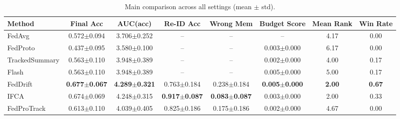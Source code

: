 \begin{table}[t]
\centering
\caption{Main comparison across all settings (mean $\pm$ std).}
\label{tab:main}
\begin{tabular}{lccccccc}
\toprule
Method & Final Acc & AUC(acc) & Re-ID Acc & Wrong Mem & Budget Score & Mean Rank & Win Rate \\
\midrule
FedAvg & 0.572$\pm$0.094 & 3.706$\pm$0.252 & -- & -- & -- & 4.17 & 0.00 \\
FedProto & 0.437$\pm$0.095 & 3.580$\pm$0.100 & -- & -- & 0.003$\pm$0.000 & 6.17 & 0.00 \\
TrackedSummary & 0.563$\pm$0.110 & 3.948$\pm$0.389 & -- & -- & 0.002$\pm$0.000 & 4.00 & 0.17 \\
Flash & 0.563$\pm$0.110 & 3.948$\pm$0.389 & -- & -- & 0.005$\pm$0.000 & 5.00 & 0.17 \\
FedDrift & \textbf{0.677$\pm$0.067} & \textbf{4.289$\pm$0.321} & 0.763$\pm$0.184 & 0.238$\pm$0.184 & \textbf{0.005$\pm$0.000} & \textbf{2.00} & \textbf{0.67} \\
IFCA & 0.674$\pm$0.069 & 4.248$\pm$0.315 & \textbf{0.917$\pm$0.087} & \textbf{0.083$\pm$0.087} & 0.003$\pm$0.000 & 2.00 & 0.33 \\
FedProTrack & 0.613$\pm$0.110 & 4.039$\pm$0.405 & 0.825$\pm$0.186 & 0.175$\pm$0.186 & 0.002$\pm$0.000 & 4.67 & 0.00 \\
\bottomrule
\end{tabular}
\end{table}